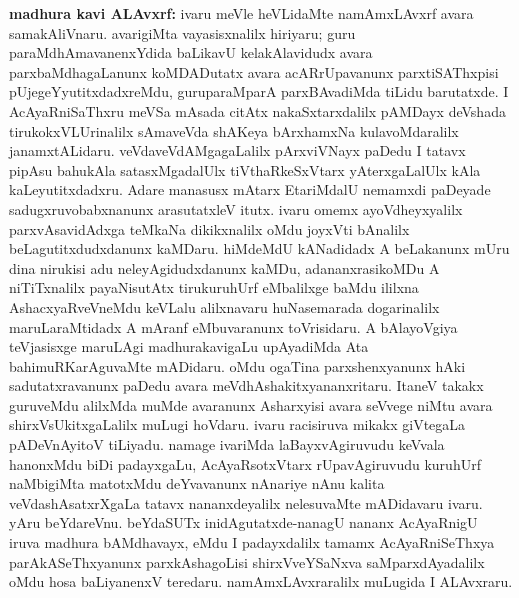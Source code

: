 {\textbf{madhura kavi ALAvxrf:}} ivaru meVle heVLidaMte namAmxLAvxrf avara samakAliVnaru. avarigiMta vayasisxnalilx hiriyaru; guru paraMdhAmavanenxYdida baLikavU kelakAlavidudx avara parxbaMdhagaLanunx koMDADutatx avara acARrUpavanunx parxtiSAThxpisi pUjegeYyutitxdadxreMdu, guruparaMparA parxBAvadiMda tiLidu barutatxde. I AcAyaRniSaThxru meVSa mAsada citAtx nakaSxtarxdalilx pAMDayx deVshada tirukokxVLUrinalilx sAmaveVda shAKeya bArxhamxNa kulavoMdaralilx janamxtALidaru. veVdaveVdAMgagaLalilx pArxviVNayx paDedu I tatavx pipAsu bahukAla satasxMgadalUlx tiVthaRkeSxVtarx yAterxgaLalUlx kAla kaLeyutitxdadxru. Adare manasusx mAtarx EtariMdalU nemamxdi paDeyade sadugxruvobabxnanunx arasutatxleV itutx. ivaru omemx ayoVdheyxyalilx parxvAsavidAdxga teMkaNa dikikxnalilx oMdu joyxVti bAnalilx beLagutitxdudxdanunx kaMDaru. hiMdeMdU kANadidadx A beLakanunx mUru dina nirukisi adu neleyAgidudxdanunx kaMDu, adananxrasikoMDu A niTiTxnalilx payaNisutAtx tirukuruhUrf eMbalilxge baMdu ililxna AshacxyaRveVneMdu keVLalu alilxnavaru huNasemarada dogarinalilx maruLaraMtidadx A mAranf eMbuvaranunx toVrisidaru. A bAlayoVgiya teVjasisxge maruLAgi madhurakavigaLu upAyadiMda Ata bahimuRKarAguvaMte mADidaru. oMdu ogaTina parxshenxyanunx hAki sadutatxravanunx paDedu avara meVdhAshakitxyananxritaru. ItaneV takakx guruveMdu alilxMda muMde avaranunx Asharxyisi avara seVvege niMtu avara shirxVsUkitxgaLalilx muLugi hoVdaru. ivaru racisiruva mikakx giVtegaLa pADeVnAyitoV tiLiyadu. namage ivariMda laBayxvAgiruvudu keVvala hanonxMdu biDi padayxgaLu, AcAyaRsotxVtarx rUpavAgiruvudu kuruhUrf naMbigiMta matotxMdu deYvavanunx nAnariye nAnu kalita veVdashAsatxrXgaLa tatavx nananxdeyalilx nelesuvaMte mADidavaru ivaru. yAru beYdareVnu. beYdaSUTx inidAgutatxde-nanagU nananx AcAyaRnigU iruva madhura bAMdhavayx, eMdu I padayxdalilx tamamx AcAyaRniSeThxya parAkASeThxyanunx parxkAshagoLisi shirxVveYSaNxva saMparxdAyadalilx oMdu hosa baLiyanenxV teredaru. namAmxLAvxraralilx muLugida I ALAvxraru.

